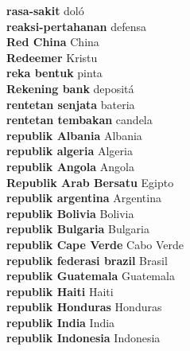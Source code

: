 \textbf{ rasa-sakit  } doló \\
\textbf{ reaksi-pertahanan  } defensa \\
\textbf{ Red China  } China \\
\textbf{ Redeemer  } Kristu \\
\textbf{ reka bentuk  } pinta \\
\textbf{ Rekening bank  } depositá \\
\textbf{ rentetan senjata  } bateria \\
\textbf{ rentetan tembakan  } candela \\
\textbf{ republik Albania  } Albania \\
\textbf{ republik algeria  } Algeria \\
\textbf{ republik Angola  } Angola \\
\textbf{ Republik Arab Bersatu  } Egipto \\
\textbf{ republik argentina  } Argentina \\
\textbf{ republik Bolivia  } Bolivia \\
\textbf{ republik Bulgaria  } Bulgaria \\
\textbf{ republik Cape Verde  } Cabo Verde \\
\textbf{ republik federasi brazil  } Brasil \\
\textbf{ republik Guatemala  } Guatemala \\
\textbf{ republik Haiti  } Haiti \\
\textbf{ republik Honduras  } Honduras \\
\textbf{ republik India  } India \\
\textbf{ republik Indonesia  } Indonesia \\
